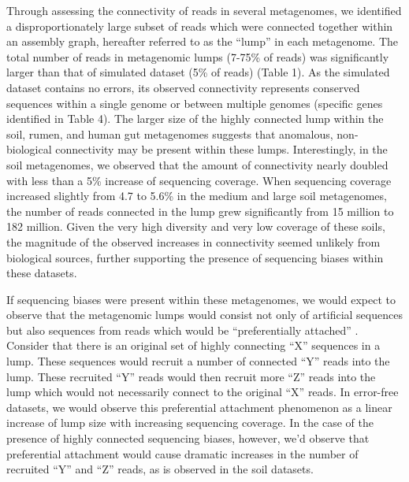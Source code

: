 \documentclass[10pt]{article}
\begin{document}
Through assessing the connectivity of reads in several metagenomes, we identified a disproportionately large subset of reads which were connected together within an assembly graph, hereafter referred to as the ``lump'' in each metagenome.  The total number of reads in metagenomic lumps (7-75\% of reads) was significantly larger than that of simulated dataset (5\% of reads) (Table 1).  As the simulated dataset contains no errors, its observed connectivity represents conserved sequences within a single genome or between multiple genomes (specific genes identified in Table 4).  The larger size of the highly connected lump within the soil, rumen, and human gut metagenomes suggests that anomalous, non-biological connectivity may be present within these lumps.  Interestingly, in the soil metagenomes, we observed that the amount of connectivity nearly doubled with less than a 5\% increase of sequencing coverage.  When sequencing coverage increased slightly from 4.7 to 5.6\% in the medium and large soil metagenomes, the number of reads connected in the lump grew significantly from 15 million to 182 million.  Given the very high diversity and very low coverage of these soils, the magnitude of the observed increases in connectivity seemed unlikely from biological sources, further supporting the presence of sequencing biases within these datasets.  

If sequencing biases were present within these metagenomes, we would expect to observe that the metagenomic lumps would consist not only of artificial sequences but also sequences from reads which would be ``preferentially attached'' \cite{Barabasi:1999p1083}.  Consider that there is an original set of highly connecting ``X'' sequences in a lump.  These sequences would recruit a number of connected ``Y'' reads into the lump.  These recruited ``Y'' reads would then recruit more ``Z'' reads into the lump which would not necessarily connect to the original ``X'' reads.  In error-free datasets, we would observe this preferential attachment phenomenon as a linear increase of lump size with increasing sequencing coverage.  In the case of the presence of highly connected sequencing biases, however, we'd observe that preferential attachment would cause dramatic increases in the number of recruited ``Y'' and ``Z'' reads, as is observed in the soil datasets.   
\end{document}
